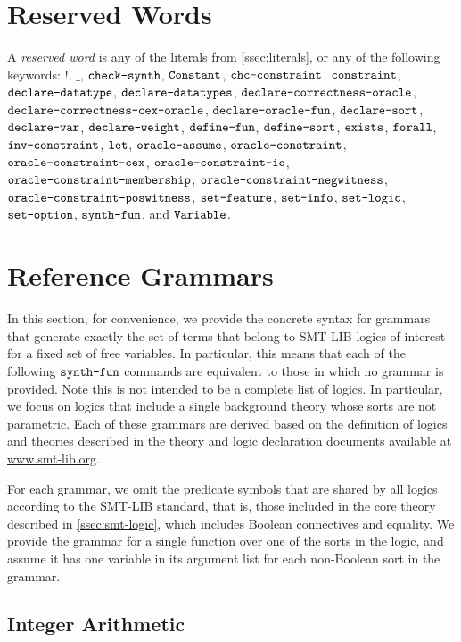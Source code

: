\documentclass[english,a4paper,10pt]{article}
\begin{document}
\newpage
\begin{appendix}

\section{Reserved Words}%
\label{apx:reserved}

A \emph{reserved word} is any of the 
literals from \cref{ssec:literals},
or any of the following keywords:
$!$,
$\_$,
$\texttt{check-synth}$,
$\texttt{Constant}$,
$\texttt{chc-constraint}$,
$\texttt{constraint}$,
$\texttt{declare-datatype}$,
$\texttt{declare-datatypes}$,
$\texttt{declare-correctness-oracle}$,
$\texttt{declare-correctness-cex-oracle}$,
$\texttt{declare-oracle-fun}$,
$\texttt{declare-sort}$,
$\texttt{declare-var}$,
$\texttt{declare-weight}$,
$\texttt{define-fun}$,
$\texttt{define-sort}$,
$\texttt{exists}$,
$\texttt{forall}$,
$\texttt{inv-constraint}$,
$\texttt{let}$,
$\texttt{oracle-assume}$,
$\texttt{oracle-constraint}$,
$\texttt{oracle-constraint-cex}$,
$\texttt{oracle-constraint-io}$,
$\texttt{oracle-constraint-membership}$,
$\texttt{oracle-constraint-negwitness}$,
$\texttt{oracle-constraint-poswitness}$,
$\texttt{set-feature}$,
$\texttt{set-info}$,
$\texttt{set-logic}$,
$\texttt{set-option}$,
$\texttt{synth-fun}$, and
$\texttt{Variable}$.


\section{Reference Grammars}%
\label{apx:ref-grammars}

In this section, for convenience, we provide the concrete syntax for
grammars that generate exactly the set of terms 
that belong to SMT-LIB logics of interest for a fixed set of free variables.
In particular, this means that each of the following $\texttt{synth-fun}$
commands are equivalent to those in which no grammar is provided.
Note this is not intended to be a complete list of logics.
In particular, we focus on logics that include a single background theory
whose sorts are not parametric.
Each of these grammars are derived
based on the definition of logics and theories
described in the theory and logic declaration documents
available at \url{www.smt-lib.org}.

For each grammar, we omit 
the predicate symbols that are shared by all logics
according to the SMT-LIB standard, that is,
those included in the core theory described in \cref{ssec:smt-logic},
which includes Boolean connectives and equality.
We provide the grammar
for a single function over one of the sorts in the logic,
and assume it has one variable in its argument list
for each non-Boolean sort in the grammar.

\subsection{Integer Arithmetic}


\end{appendix}
\end{document}
